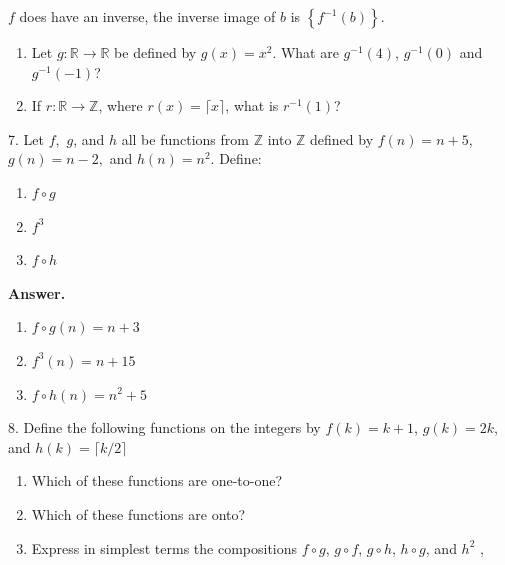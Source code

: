 \documentclass[10pt,]{book}
\theoremstyle{plain}
\theoremstyle{definition}
\theoremstyle{definition}
\theoremstyle{definition}
\begin{document}
\begin{exercisegroup}
\(f\) does have an inverse, the inverse image of \(b\) is \(\left\{f^{-1}(b)\right\}\).%
\par
\leavevmode%
\begin{enumerate}[label=\alph*]
\item\hypertarget{li-90}{} Let \(g : \mathbb{R} \to  \mathbb{R}\) be defined by \(g(x) = x^2\). What are \(g^{-1}(4)\), \(g^{-1}(0)\) and \(g^{-1}(-1)\)?%
\item\hypertarget{li-91}{} If \(r: \mathbb{R}\to \mathbb{Z}\), where \(r(x) = \lceil x\rceil\),  what is \(r^{-1}(1)\)?%
\end{enumerate}
%
\par\smallskip
\item[7.]\hypertarget{exercise-29}{} Let \( f,\)  \(g\), and \(h\) all be functions from \(\mathbb{Z}\) into \(\mathbb{Z}\) defined by \(f(n) = n + 5\), \(g(n) = n - 2,\)
and \(h(n)=n^2\). Define:%
\par
\leavevmode%
\begin{enumerate}[label=\alph*]
\item\hypertarget{li-92}{} \(f\circ g\)%
\item\hypertarget{li-93}{} \(f^3\)%
\item\hypertarget{li-94}{} \(f\circ h\)%
\end{enumerate}
%
\par\smallskip
\par\smallskip
\noindent\textbf{Answer.}\hypertarget{answer-13}{}\quad
\leavevmode%
\begin{multicols}{3}
\begin{enumerate}[label=\alph*]
\item\hypertarget{li-95}{} \(f\circ g(n)=n+3\)%
\item\hypertarget{li-96}{} \(f^3(n)=n+15\)   %
\item\hypertarget{li-97}{} \(f\circ h(n)=n^2+5\) %
\end{enumerate}
\end{multicols}
%
\item[8.]\hypertarget{exercise-30}{}Define the following functions on the integers by \(f(k) = k + 1\), \(g(k) = 2k\), and \(h(k)=\lceil k/2\rceil\) %
\par
\leavevmode%
\begin{enumerate}[label=\alph*]
\item\hypertarget{li-98}{} Which of these functions are one-to-one?%
\item\hypertarget{li-99}{} Which of these functions are onto?%
\item\hypertarget{li-100}{} Express in simplest terms the compositions \(f\circ g\), \(g \circ f\), \(g \circ  h\), \(h \circ  g\), and \(h^2\) ,%

\end{enumerate}
\end{exercisegroup}
\end{document}
